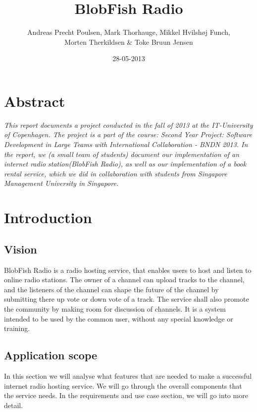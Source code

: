 \documentclass[a4paper,11pt,report]{article}
\begin{document}
\title{BlobFish Radio}
\author{Andreas Precht Poulsen, Mark Thorhauge, Mikkel Hvilsh\o j Funch,\\Morten Therkildsen \& Toke Bruun Jensen}
\date{28-05-2013}
\maketitle
\newpage
\section*{Abstract}
\emph{
This report documents a project conducted in the fall of 2013 at the IT-University of Copenhagen. The project is a part of the course: Second Year Project: Software Development in Large Teams with International Collaboration - BNDN 2013. In the report, we (a small team of students) document our implementation of an internet radio station(BlobFish Radio), as well as our implementation of a book rental service, which we did in collaboration with students from Singapore Management University in Singapore.}\\ 
\newpage

\tableofcontents

\section{Introduction}
\subsection{Vision}
BlobFish Radio is a radio hosting service, that enables users to host and listen to online radio stations. The owner of a channel can upload tracks to the channel, and the listeners of the channel can shape the future of the channel by submitting there up vote or down vote of a track. The service shall also promote the community by making room for discussion of channels.
It is a system intended to be used by the common user, without any special knowledge or training.

\subsection{Application scope}
In this section we will analyse what features that are needed to make a successful internet radio hosting service. We will go through the overall components that the service needs. In the requirements and use case section, we will go into more detail.
\end{document}
